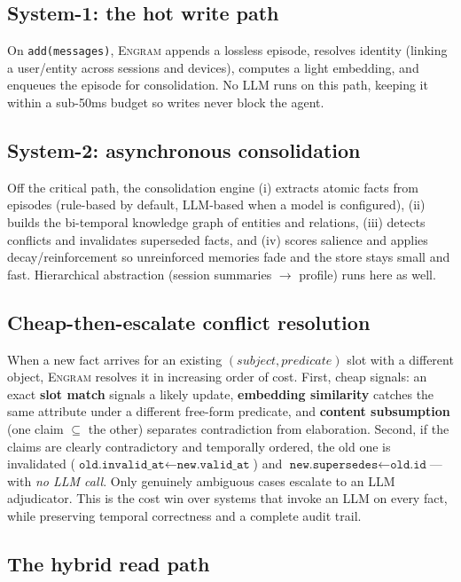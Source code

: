 \documentclass{article}
\newcommand{\engram}{\textsc{Engram}}
\begin{document}
\subsection{System-1: the hot write path}

On \texttt{add(messages)}, \engram{} appends a lossless episode, resolves identity (linking a user/entity
across sessions and devices), computes a light embedding, and enqueues the episode for consolidation. No LLM
runs on this path, keeping it within a sub-50ms budget so writes never block the agent.

\subsection{System-2: asynchronous consolidation}

Off the critical path, the consolidation engine (i) extracts atomic facts from episodes (rule-based by
default, LLM-based when a model is configured), (ii) builds the bi-temporal knowledge graph of entities and
relations, (iii) detects conflicts and invalidates superseded facts, and (iv) scores salience and applies
decay/reinforcement so unreinforced memories fade and the store stays small and fast. Hierarchical
abstraction (session summaries $\rightarrow$ profile) runs here as well.

\subsection{Cheap-then-escalate conflict resolution}

When a new fact arrives for an existing $(\textit{subject},\textit{predicate})$ slot with a different object,
\engram{} resolves it in increasing order of cost. First, cheap signals: an exact \textbf{slot match}
signals a likely update, \textbf{embedding similarity} catches the same attribute under a different
free-form predicate, and \textbf{content subsumption} (one claim $\subseteq$ the other) separates
contradiction from elaboration. Second, if the claims are clearly contradictory and temporally ordered, the
old one is invalidated ($\texttt{old.invalid\_at} \leftarrow \texttt{new.valid\_at}$) and
$\texttt{new.supersedes} \leftarrow \texttt{old.id}$---with \emph{no LLM call}. Only genuinely ambiguous cases
escalate to an LLM adjudicator. This is the cost win over systems that invoke an LLM on every fact, while
preserving temporal correctness and a complete audit trail.

\subsection{The hybrid read path}
\end{document}
